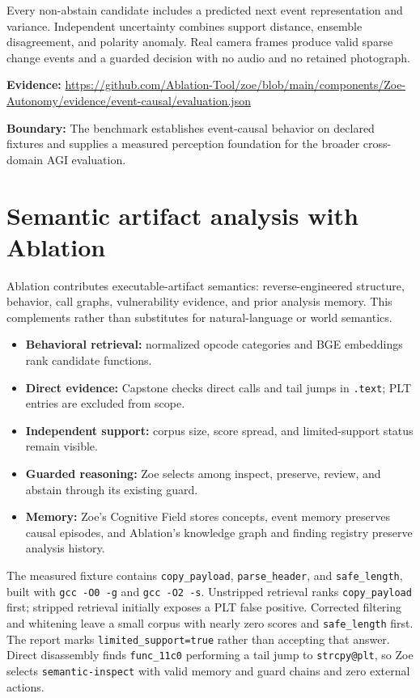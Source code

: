 \documentclass[11pt]{article}
\newcommand{\boundary}[1]{\par\smallskip\small\color{ZoeGray}\textbf{Boundary:} #1\normalsize\par\smallskip}
\newcommand{\evidence}[1]{\par\smallskip\small\color{ZoeGray}\textbf{Evidence:} #1\normalsize\par\smallskip}
\begin{document}
Every non-abstain candidate includes a predicted next event representation and variance. Independent uncertainty combines support distance, ensemble disagreement, and polarity anomaly. Real camera frames produce valid sparse change events and a guarded decision with no audio and no retained photograph.

\evidence{\url{https://github.com/Ablation-Tool/zoe/blob/main/components/Zoe-Autonomy/evidence/event-causal/evaluation.json}}
\boundary{The benchmark establishes event-causal behavior on declared fixtures and supplies a measured perception foundation for the broader cross-domain AGI evaluation.}

\clearpage
\section{Semantic artifact analysis with Ablation}

Ablation contributes executable-artifact semantics: reverse-engineered structure, behavior, call graphs, vulnerability evidence, and prior analysis memory. This complements rather than substitutes for natural-language or world semantics.

\begin{itemize}
  \item \textbf{Behavioral retrieval:} normalized opcode categories and BGE embeddings rank candidate functions.
  \item \textbf{Direct evidence:} Capstone checks direct calls and tail jumps in \texttt{.text}; PLT entries are excluded from scope.
  \item \textbf{Independent support:} corpus size, score spread, and limited-support status remain visible.
  \item \textbf{Guarded reasoning:} Zoe selects among inspect, preserve, review, and abstain through its existing guard.
  \item \textbf{Memory:} Zoe's Cognitive Field stores concepts, event memory preserves causal episodes, and Ablation's knowledge graph and finding registry preserve analysis history.
\end{itemize}

The measured fixture contains \texttt{copy\_payload}, \texttt{parse\_header}, and \texttt{safe\_length}, built with \texttt{gcc -O0 -g} and \texttt{gcc -O2 -s}. Unstripped retrieval ranks \texttt{copy\_payload} first; stripped retrieval initially exposes a PLT false positive. Corrected filtering and whitening leave a small corpus with nearly zero scores and \texttt{safe\_length} first. The report marks \texttt{limited\_support=true} rather than accepting that answer. Direct disassembly finds \texttt{func\_11c0} performing a tail jump to \texttt{strcpy@plt}, so Zoe selects \texttt{semantic-inspect} with valid memory and guard chains and zero external actions.
\end{document}
